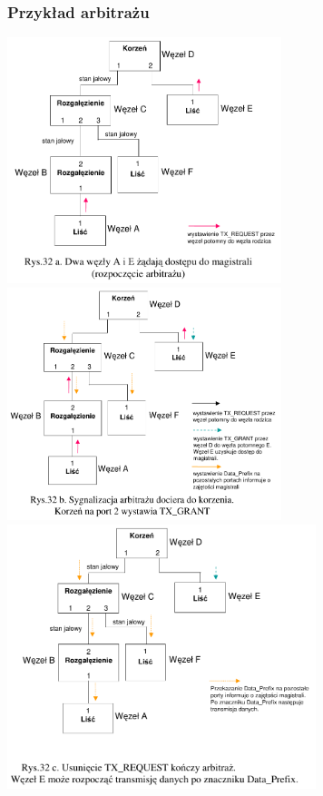\subsubsection{Przykład arbitrażu}
\includegraphics[width=8cm]{./wyklady/FIREWIRE_36_1.pdf}
\includegraphics[width=8cm]{./wyklady/FIREWIRE_37_1.pdf}\\
\includegraphics[width=9cm]{./wyklady/FIREWIRE_38_1.pdf}\\
